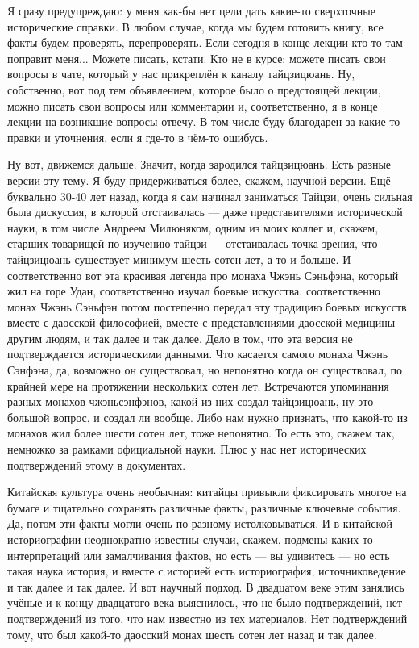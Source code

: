 Я сразу предупреждаю: у меня как-бы нет цели 
дать какие-то сверхточные исторические справки. В любом случае, когда мы будем готовить книгу,
все факты будем проверять, перепроверять. Если сегодня в конце лекции кто-то там 
поправит меня... Можете писать, кстати. Кто не в курсе: можете писать свои вопросы в чате, который 
у нас прикреплён к каналу тайцзицюань. Ну, собственно, вот под тем объявлением, которое было 
о предстоящей лекции, можно писать свои вопросы или комментарии и, соответственно, я в конце 
лекции на возникшие вопросы отвечу. В том числе буду благодарен за какие-то правки и 
уточнения, если я где-то в чём-то ошибусь.

Ну вот, движемся дальше. Значит, когда зародился 
тайцзицюань. Есть разные версии эту тему. Я буду придерживаться более, скажем, научной версии.
Ещё буквально 30-40 лет назад, когда я сам начинал заниматься Тайцзи, очень сильная была 
дискуссия, в которой отстаивалась --- даже представителями исторической науки, в том числе 
Андреем Милюняком, одним из моих коллег и, скажем, старших товарищей по изучению тайцзи --- 
отстаивалась точка зрения, что тайцзицюань существует минимум шесть сотен лет, а то и 
больше. И соответственно вот эта красивая легенда про монаха Чжэнь Сэньфэна, который жил на 
горе Удан, соответственно изучал боевые искусства, соответственно монах Чжэнь Сэньфэн потом 
постепенно передал эту традицию боевых искусств вместе с даосской философией, вместе с 
представлениями даосской медицины другим людям, и так далее и так далее. Дело в том, что эта 
версия не подтверждается историческими данными. Что касается самого монаха Чжэнь Сэнфэна, 
да, возможно он существовал, но непонятно когда он существовал, по крайней мере на 
протяжении нескольких сотен лет. Встречаются упоминания разных монахов чжэньсэнфэнов, какой 
из них создал тайцзицюань, ну это большой вопрос, и создал ли вообще. Либо нам нужно признать, 
что какой-то из монахов жил более шести сотен лет, тоже непонятно. То есть это, скажем так, 
немножко за рамками официальной науки. Плюс у нас нет исторических подтверждений этому в 
документах.

Китайская культура очень необычная: китайцы привыкли 
фиксировать многое на бумаге и тщательно сохранять различные факты, различные ключевые 
события. Да, потом эти факты могли очень по-разному истолковываться. И в китайской 
историографии неоднократно известны случаи, скажем, подмены каких-то интерпретаций или 
замалчивания фактов, но есть --- вы удивитесь --- но есть такая наука история, и вместе с историей 
есть историография, источниковедение и так далее и так далее. И вот научный подход. В 
двадцатом веке этим занялись учёные и к концу двадцатого века выяснилось, что не было 
подтверждений, нет подтверждений из того, что нам известно из тех материалов. Нет
подтверждений тому, что был какой-то даосский монах шесть сотен лет назад и так далее.

